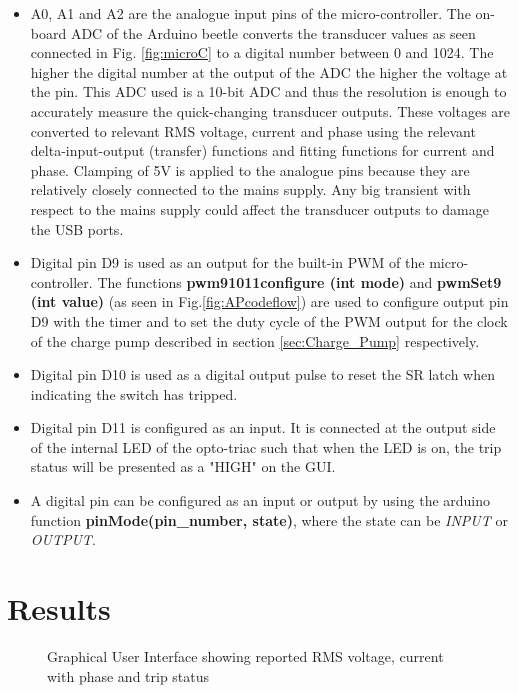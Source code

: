 \begin{itemize}
    \item A0, A1 and A2 are the analogue input pins of the micro-controller. The on-board ADC of the Arduino beetle converts the transducer values as seen connected in Fig. \ref{fig:microC} to a digital number between 0 and 1024. The higher the digital number at the output of the ADC the higher the voltage at the pin. This ADC used is a 10-bit ADC and thus the resolution is enough to accurately measure the quick-changing transducer outputs. These voltages are converted to relevant RMS voltage, current and phase using the relevant delta-input-output (transfer) functions and fitting functions for current and phase. Clamping of 5V is applied to the analogue pins because they are relatively closely connected to the mains supply. Any big transient with respect to the mains supply could affect the transducer outputs to damage the USB ports.
    \item Digital pin D9 is used as an output for the built-in PWM of the micro-controller. The functions \textbf{pwm91011configure (int mode)} and \textbf{pwmSet9 (int value)}  (as seen in Fig.\ref{fig:APcodeflow}) are used to configure output pin D9 with the timer and to set the duty cycle of the PWM output for the clock of the charge pump described in section \ref{sec:Charge_Pump}  respectively.
    \item Digital pin D10 is used as a digital output pulse to reset the SR latch when indicating the switch has tripped.
    \item Digital pin D11 is configured as an input. It is connected at the output side of the internal LED of the opto-triac such that when the LED is on, the trip status will be presented as a "HIGH" on the GUI.
    \item A digital pin can be configured as an input or output by using the arduino function \textbf{pinMode(pin\_number, state)}, where the state can be \textit{INPUT} or \textit{OUTPUT}.
\end{itemize}

\section{Results} \label{sec:rep_results}

\begin{figure}[H]
    \centering
    \caption{Graphical User Interface showing reported RMS voltage, current with phase and trip status}
    \label{fig:GUI}
\end{figure}

